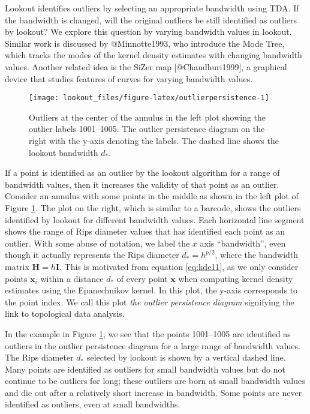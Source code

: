 \documentclass[
]{article}
\begin{document}
Lookout identifies outliers by selecting an appropriate bandwidth using
TDA. If the bandwidth is changed, will the original outliers be still
identified as outliers by lookout? We explore this question by varying
bandwidth values in lookout. Similar work is discussed by @Minnotte1993,
who introduce the Mode Tree, which tracks the modes of the kernel
density estimates with changing bandwidth values. Another related idea
is the SiZer map {[}@Chaudhuri1999{]}, a graphical device that studies
features of curves for varying bandwidth values.

\begin{figure}
\texttt{[image: lookout\_files/figure-latex/outlierpersistence-1]} \caption{Outliers at the center of the annulus in the left plot showing the outlier labels 1001--1005. The outlier persistence diagram on the right with the y-axis denoting the labels. The dashed line shows the lookout bandwidth $d_*$.}\label{fig:outlierpersistence}
\end{figure}

If a point is identified as an outlier by the lookout algorithm for a
range of bandwidth values, then it increases the validity of that point
as an outlier. Consider an annulus with some points in the middle as
shown in the left plot of Figure \ref{fig:outlierpersistence}. The plot
on the right, which is similar to a barcode, shows the outliers
identified by lookout for different bandwidth values. Each horizontal
line segment shows the range of Rips diameter values that has identified
each point as an outlier. With some abuse of notation, we label the
\(x\) axis ``bandwidth'', even though it actually represents the Rips
diameter \(d_* = h^{p/2}\), where the bandwidth matrix
\(\bm{H} = h\bm{I}\). This is motivated from equation \eqref{eq:kde11},
as we only consider points \(\bm{x}_i\) within a distance \(d_*\) of
every point \(\bm{x}\) when computing kernel density estimates using the
Epanechnikov kernel. In this plot, the y-axis corresponds to the point
index. We call this plot \emph{the outlier persistence diagram}
signifying the link to topological data analysis.

In the example in Figure \ref{fig:outlierpersistence}, we see that the
points 1001--1005 are identified as outliers in the outlier persistence
diagram for a large range of bandwidth values. The Rips diameter \(d_*\)
selected by lookout is shown by a vertical dashed line. Many points are
identified as outliers for small bandwidth values but do not continue to
be outliers for long; these outliers are born at small bandwidth values
and die out after a relatively short increase in bandwidth. Some points
are never identified as outliers, even at small bandwidths.
\end{document}
